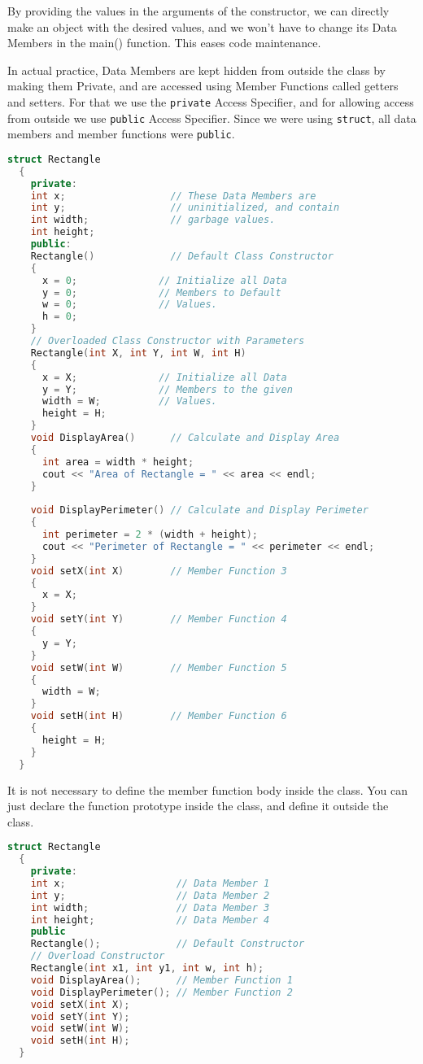 \documentclass[11pt,fleqn]{book} %
\begin{document}
By providing the values in the arguments of the constructor, we can directly make an object with the desired values, and we won't have to change its Data Members in the main() function. This eases code maintenance.

In actual practice, Data Members are kept hidden from outside the class by making them Private, and are accessed using Member Functions called getters and setters. For that we use the \texttt{private} Access Specifier, and for allowing access from outside we use \texttt{public} Access Specifier. Since we were using \texttt{struct}, all data members and member functions were \texttt{public}.

\begin{lstlisting}[language=C++, caption=Class Definition using the \texttt{struct} keyword in C++]
  struct Rectangle
  {
    private:
    int x;                  // These Data Members are
    int y;                  // uninitialized, and contain
    int width;              // garbage values.
    int height;            
    public:
    Rectangle()             // Default Class Constructor
    {
      x = 0;              // Initialize all Data
      y = 0;              // Members to Default
      w = 0;              // Values.
      h = 0;
    }
    // Overloaded Class Constructor with Parameters
    Rectangle(int X, int Y, int W, int H)
    {
      x = X;              // Initialize all Data
      y = Y;              // Members to the given
      width = W;          // Values.
      height = H;
    }
    void DisplayArea()      // Calculate and Display Area
    {
      int area = width * height;
      cout << "Area of Rectangle = " << area << endl;
    }
    
    void DisplayPerimeter() // Calculate and Display Perimeter
    {
      int perimeter = 2 * (width + height);
      cout << "Perimeter of Rectangle = " << perimeter << endl;
    }
    void setX(int X)        // Member Function 3
    {
      x = X;
    }
    void setY(int Y)        // Member Function 4
    {
      y = Y;
    }
    void setW(int W)        // Member Function 5
    {
      width = W;
    }
    void setH(int H)        // Member Function 6
    {
      height = H;
    }
  }
\end{lstlisting}

It is not necessary to define the member function body inside the class. You can just declare the function prototype inside the class, and define it outside the class.

\begin{lstlisting}[language=C++, caption=Class Definition using the \texttt{struct} keyword in C++]
  struct Rectangle
  {
    private:
    int x;                   // Data Member 1
    int y;                   // Data Member 2
    int width;               // Data Member 3
    int height;              // Data Member 4
    public
    Rectangle();             // Default Constructor
    // Overload Constructor
    Rectangle(int x1, int y1, int w, int h);
    void DisplayArea();      // Member Function 1
    void DisplayPerimeter(); // Member Function 2
    void setX(int X);
    void setY(int Y);
    void setW(int W);
    void setH(int H);
  }
\end{lstlisting}
\end{document}
